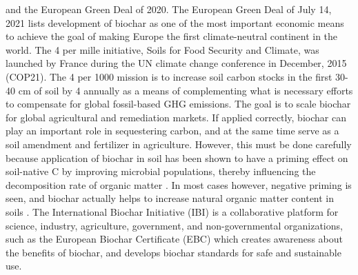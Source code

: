 and the European Green Deal of 2020. The European Green Deal of July 14, 2021 lists development of biochar as one of the most important economic means to achieve the goal of making Europe the first climate-neutral continent in the world. The 4 per mille initiative, Soils for Food Security and Climate, was launched by France during the UN climate change conference in December, 2015 (COP21). The 4 per 1000 mission is to increase soil carbon stocks in the first 30-40 cm of soil by 4 \textperthousand  annually as a means of complementing what is necessary efforts to compensate for global fossil-based GHG emissions. The goal is to scale biochar for global agricultural and remediation markets. If applied correctly, biochar can play an important role in sequestering carbon, and at the same time serve as a soil amendment and fertilizer in agriculture. However, this must be done carefully because application of biochar in soil has been shown to have a priming effect on soil-native C by improving microbial populations, thereby influencing the decomposition rate of organic matter \citep{Ahmad2014}. In most cases however, negative priming is seen, and biochar actually helps to increase natural organic matter content in soils \citep{chen2019competitive,weng2018accumulation}. The International Biochar Initiative (IBI) is a collaborative platform for science, industry, agriculture, government, and non-governmental organizations, such as the European Biochar Certificate (EBC) which creates awareness about the benefits of biochar, and develops biochar standards for safe and sustainable use. 

